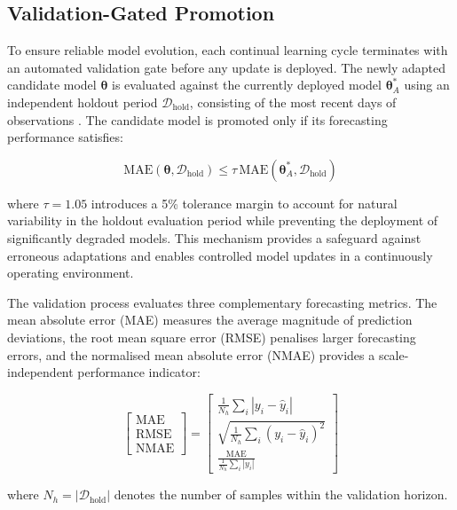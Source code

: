 \documentclass[journal]{IEEEtran}
\newcommand{\params}{\bm{\theta}}
\begin{document}
\subsection{Validation-Gated Promotion}
\label{sec:validation_gate}

To ensure reliable model evolution, each continual learning cycle
terminates with an automated validation gate before any update is
deployed. The newly adapted candidate model $\params$ is evaluated
against the currently deployed model $\params_A^*$ using an independent
holdout period $\mathcal{D}_{\mathrm{hold}}$, consisting of the most
recent days of observations .
The candidate model is promoted only if its forecasting performance
satisfies:

\begin{equation}
    \mathrm{MAE}(\params,\mathcal{D}_{\mathrm{hold}})
    \leq
    \tau \,
    \mathrm{MAE}(\params_A^*,\mathcal{D}_{\mathrm{hold}})
    \label{eq:validation}
\end{equation}

where $\tau=1.05$ introduces a 5\% tolerance margin to account for
natural variability in the holdout evaluation period while preventing
the deployment of significantly degraded models. This mechanism
provides a safeguard against erroneous adaptations and enables controlled
model updates in a continuously operating environment.

The validation process evaluates three complementary forecasting
metrics. The mean absolute error (MAE) measures the average magnitude of
prediction deviations, the root mean square error (RMSE) penalises larger
forecasting errors, and the normalised mean absolute error (NMAE)
provides a scale-independent performance indicator:

\begin{equation}
\begin{bmatrix}
\mathrm{MAE} \\[2mm]
\mathrm{RMSE} \\[2mm]
\mathrm{NMAE}
\end{bmatrix}
=
\begin{bmatrix}
\frac{1}{N_h}\sum_i |y_i-\hat{y}_i|
\\[4mm]
\sqrt{\frac{1}{N_h}\sum_i (y_i-\hat{y}_i)^2}
\\[4mm]
\frac{\mathrm{MAE}}
{\frac{1}{N_h}\sum_i |y_i|}
\end{bmatrix}
\label{eq:forecast_metrics}
\end{equation}

where $N_h=|\mathcal{D}_{\mathrm{hold}}|$ denotes the number of samples
within the validation horizon.
\end{document}
